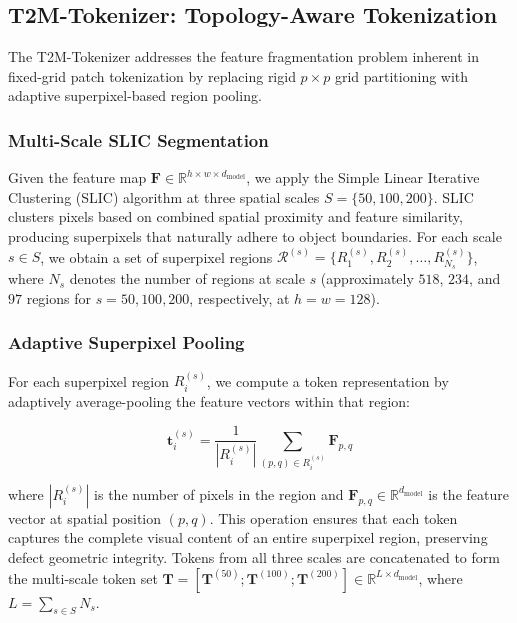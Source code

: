 \documentclass[lettersize,journal]{IEEEtran}
\begin{document}
\subsection{T2M-Tokenizer: Topology-Aware Tokenization}
\label{sec:t2m}

The T2M-Tokenizer addresses the feature fragmentation problem inherent in fixed-grid patch tokenization by replacing rigid $p \times p$ grid partitioning with adaptive superpixel-based region pooling.

\subsubsection{Multi-Scale SLIC Segmentation}

Given the feature map $\mathbf{F} \in \mathbb{R}^{h \times w \times d_{\text{model}}}$, we apply the Simple Linear Iterative Clustering (SLIC) algorithm at three spatial scales $S = \{50, 100, 200\}$. SLIC clusters pixels based on combined spatial proximity and feature similarity, producing superpixels that naturally adhere to object boundaries. For each scale $s \in S$, we obtain a set of superpixel regions $\mathcal{R}^{(s)} = \{R^{(s)}_1, R^{(s)}_2, \ldots, R^{(s)}_{N_s}\}$, where $N_s$ denotes the number of regions at scale $s$ (approximately $518$, $234$, and $97$ regions for $s = 50, 100, 200$, respectively, at $h = w = 128$).

\subsubsection{Adaptive Superpixel Pooling}

For each superpixel region $R^{(s)}_i$, we compute a token representation by adaptively average-pooling the feature vectors within that region:

\begin{equation}
\label{eq:pooling}
\mathbf{t}^{(s)}_i = \frac{1}{|R^{(s)}_i|} \sum_{(p,q) \in R^{(s)}_i} \mathbf{F}_{p,q}
\end{equation}

where $|R^{(s)}_i|$ is the number of pixels in the region and $\mathbf{F}_{p,q} \in \mathbb{R}^{d_{\text{model}}}$ is the feature vector at spatial position $(p,q)$. This operation ensures that each token captures the complete visual content of an entire superpixel region, preserving defect geometric integrity. Tokens from all three scales are concatenated to form the multi-scale token set $\mathbf{T} = [\mathbf{T}^{(50)}; \mathbf{T}^{(100)}; \mathbf{T}^{(200)}] \in \mathbb{R}^{L \times d_{\text{model}}}$, where $L = \sum_{s \in S} N_s$.
\end{document}

